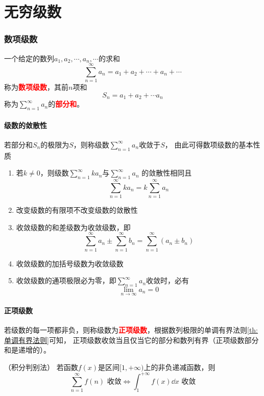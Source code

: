 \part{无穷级数}
\section{数项级数}
一个给定的数列$a_1,a_2,\cdots,a_n,\cdots$的求和
\[ \sum_{n=1}^\infty a_n = a_1 + a_2 + \cdots + a_n + \cdots \]
称为\textcolor{red}{\textbf{\textsf{数项级数}}}，其前$n$项和
\[ S_n = a_1 + a_2 + \cdots a_n \]
称为$\displaystyle \sum_{n=1}^\infty a_n$的\textcolor{red}{\textbf{\textsf{部分和}}}。

\subsection{级数的敛散性}
若部分和$S_n$的极限为$S$，则称级数$\displaystyle\sum_{n=1}^\infty a_n$收敛于$S$，
由此可得数项级数的基本性质
\begin{enumerate}[itemindent=1em,label=\textbf{\textsf{性质}}\arabic*]
    \item 若$k\neq 0$，则级数$\displaystyle\sum_{n=1}^\infty ka_n$与$\displaystyle\sum_{n=1}^\infty a_n$
          的敛散性相同且
          \[ \sum_{n=1}^\infty ka_n = k\sum_{n=1}^\infty a_n \]
    \item 改变级数的有限项不改变级数的敛散性
    \item 收敛级数的和差级数为收敛级数，即
          \[ \sum_{n=1}^\infty a_n \pm \sum_{n=1}^\infty b_n = \sum_{n=1}^\infty (a_n\pm b_n) \]
    \item 收敛级数的加括号级数为收敛级数
    \item 收敛级数的通项极限必为零，即$\displaystyle\sum_{n=1}^\infty a_n$收敛时，必有
          \[ \lim_{n\to\infty} a_n = 0 \]
\end{enumerate}

\subsection{正项级数}
若级数的每一项都非负，则称级数为\textcolor{red}{\textbf{\textsf{正项级数}}}，根据数列极限的单调有界法则\ref{th:单调有界法则}可知，
正项级数收敛当且仅当它的部分和数列有界（正项级数部分和是递增的）。

\begin{theorem}
    （积分判别法）
    \label{th:积分判别法}
    若函数$f(x)$是区间$[1,+\infty)$上的非负递减函数，则
    \[ \sum_{n=1}^\infty f(n)\text{ 收敛} \iff \int_1^{+\infty}f(x)\dd{x}\text{ 收敛}\]
\end{theorem}

